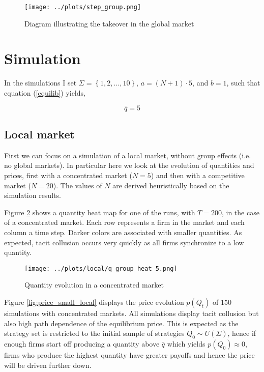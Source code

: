\documentclass[american]{scrartcl}
\newcommand{\set}[1]{\left\{#1\right\}}
\begin{document}
\begin{center}
    \begin{figure}[H]
        \center
        \texttt{[image: ../plots/step\_group.png]}
        \caption{Diagram illustrating the takeover in the global market}
        \label{fig:diagram}
    \end{figure}
\end{center}


\section{Simulation}

In the simulations I set $\Sigma = \set{1, 2, \ldots, 10}$, $a = (N + 1) \cdot 5$, and $b = 1$, such that equation (\ref{equilib}) yields,

\begin{equation}
    \bar{q} = 5
\end{equation}

\subsection{Local market}

First we can focus on a simulation of a local market, without group effects (i.e. no global markets). In particular here we look at the evolution of quantities and prices, first with a concentrated market ($N = 5$) and then with a competitive market ($N = 20$). The values of $N$ are derived heuristically based on the simulation results.

Figure \ref{fig:small_local} shows a quantity heat map for one of the runs, with $T = 200$, in the case of a concentrated market. Each row represents a firm in the market and each column a time step. Darker colors are associated with smaller quantities. As expected, tacit collusion occurs very quickly as all firms synchronize to a low quantity.

\begin{center}
    \begin{figure}[H]
        \center
        \texttt{[image: ../plots/local/q\_group\_heat\_5.png]}
        \caption{Quantity evolution in a concentrated market}
        \label{fig:small_local}
    \end{figure}
\end{center}

Figure \ref{fig:price_small_local} displays the price evolution $p(Q_t)$ of $150$ simulations with concentrated markets. All simulations display tacit collusion but also high path dependence of the equilibrium price. This is expected as the strategy set is restricted to the initial sample of strategies $Q_0 \sim U(\Sigma)$, hence if enough firms start off producing a quantity above $\bar{q}$ which yields $p(Q_0) \approx 0$, firms who produce the highest quantity have greater payoffs and hence the price will be driven further down.
\end{document}
